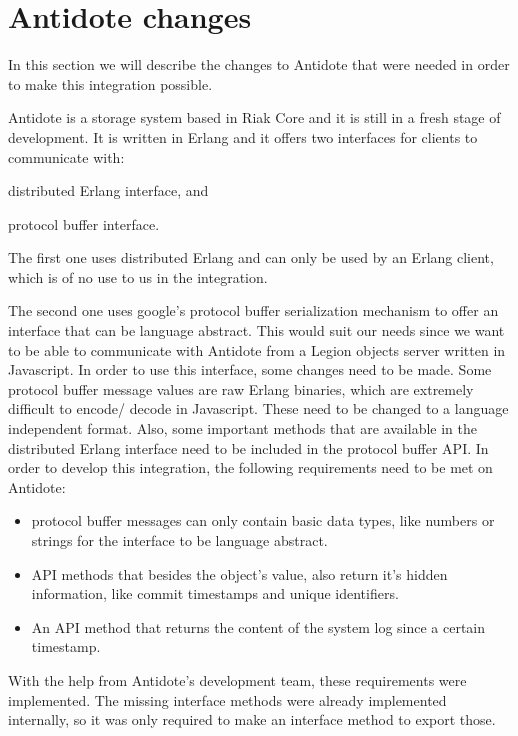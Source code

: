 \section{Antidote changes}
\label{sec:antidote_changes}
In this section we will describe the changes to Antidote that were needed in order to make this integration possible.\par
	Antidote is a storage system based in Riak Core and it is still in a fresh stage of development. It is written in Erlang and it offers two interfaces for clients to communicate with: 
\begin{enumerate*}[(i)]
\item distributed Erlang interface, and 
\item protocol buffer interface.
\end{enumerate*}
\par
	The first one uses distributed Erlang and can only be used by an Erlang client, which is of no use to us in the integration.\par
	The second one uses google's protocol buffer serialization mechanism to offer an interface that can be language abstract. This would suit our needs since we want to be able to communicate with Antidote from a Legion objects server written in Javascript. In order to use this interface, some changes need to be made. Some protocol buffer message values are raw Erlang binaries, which are extremely difficult to encode/ decode in Javascript. These need to be changed to a language independent format. Also, some important methods that are available in the distributed Erlang interface need to be included in the protocol buffer API. In order to develop this integration, the following requirements need to be met on Antidote:
	\begin{itemize}
	\item protocol buffer messages can only contain basic data types, like numbers or strings for the interface to be language abstract.
	\item API methods that besides the object's value, also return it's hidden information, like commit timestamps and unique identifiers.
	\item An API method that returns the content of the system log since a certain timestamp. 
	\end{itemize}
\par
	With the help from Antidote's development team, these requirements were implemented. The missing interface methods were already implemented internally, so it was only required to make an interface method to export those.\par
